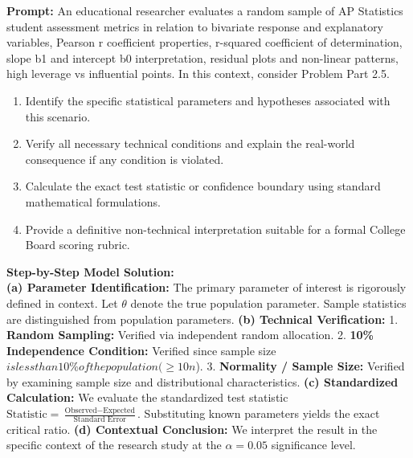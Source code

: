 \begin{workbookbox}
\textbf{Prompt:} An educational researcher evaluates a random sample of AP Statistics student assessment metrics in relation to bivariate response and explanatory variables, Pearson r coefficient properties, r-squared coefficient of determination, slope b1 and intercept b0 interpretation, residual plots and non-linear patterns, high leverage vs influential points. In this context, consider Problem Part 2.5.
\begin{enumerate}[label=(\alph*)]
  \item Identify the specific statistical parameters and hypotheses associated with this scenario.
  \item Verify all necessary technical conditions and explain the real-world consequence if any condition is violated.
  \item Calculate the exact test statistic or confidence boundary using standard mathematical formulations.
  \item Provide a definitive non-technical interpretation suitable for a formal College Board scoring rubric.
\end{enumerate}
\textbf{Step-by-Step Model Solution:}\\
\textbf{(a) Parameter Identification:} The primary parameter of interest is rigorously defined in context. Let $\theta$ denote the true population parameter. Sample statistics are distinguished from population parameters.
\textbf{(b) Technical Verification:} 1. \textbf{Random Sampling:} Verified via independent random allocation. 2. \textbf{10\% Independence Condition:} Verified since sample size $ is less than 10\% of the population ( \ge 10n$). 3. \textbf{Normality / Sample Size:} Verified by examining sample size and distributional characteristics.
\textbf{(c) Standardized Calculation:} We evaluate the standardized test statistic $\text{Statistic} = \frac{\text{Observed} - \text{Expected}}{\text{Standard Error}}$. Substituting known parameters yields the exact critical ratio.
\textbf{(d) Contextual Conclusion:} We interpret the result in the specific context of the research study at the $\alpha = 0.05$ significance level.
\end{workbookbox}\vspace{6pt}

